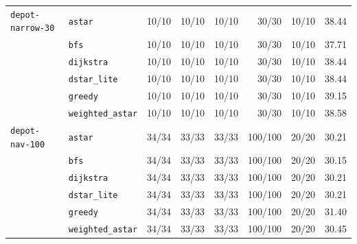 \begin{table}[t]
\begin{tabular}{llrrrrrr}
\midrule
\texttt{depot-narrow-30} & \texttt{astar} & 10/10 & 10/10 & 10/10 & 30/30 & 10/10 & 38.44 \\
 & \texttt{bfs} & 10/10 & 10/10 & 10/10 & 30/30 & 10/10 & 37.71 \\
 & \texttt{dijkstra} & 10/10 & 10/10 & 10/10 & 30/30 & 10/10 & 38.44 \\
 & \texttt{dstar\_lite} & 10/10 & 10/10 & 10/10 & 30/30 & 10/10 & 38.44 \\
 & \texttt{greedy} & 10/10 & 10/10 & 10/10 & 30/30 & 10/10 & 39.15 \\
 & \texttt{weighted\_astar} & 10/10 & 10/10 & 10/10 & 30/30 & 10/10 & 38.58 \\
\midrule
\texttt{depot-nav-100} & \texttt{astar} & 34/34 & 33/33 & 33/33 & 100/100 & 20/20 & 30.21 \\
 & \texttt{bfs} & 34/34 & 33/33 & 33/33 & 100/100 & 20/20 & 30.15 \\
 & \texttt{dijkstra} & 34/34 & 33/33 & 33/33 & 100/100 & 20/20 & 30.21 \\
 & \texttt{dstar\_lite} & 34/34 & 33/33 & 33/33 & 100/100 & 20/20 & 30.21 \\
 & \texttt{greedy} & 34/34 & 33/33 & 33/33 & 100/100 & 20/20 & 31.40 \\
 & \texttt{weighted\_astar} & 34/34 & 33/33 & 33/33 & 100/100 & 20/20 & 30.45 \\
\bottomrule
\end{tabular}
\end{table}
